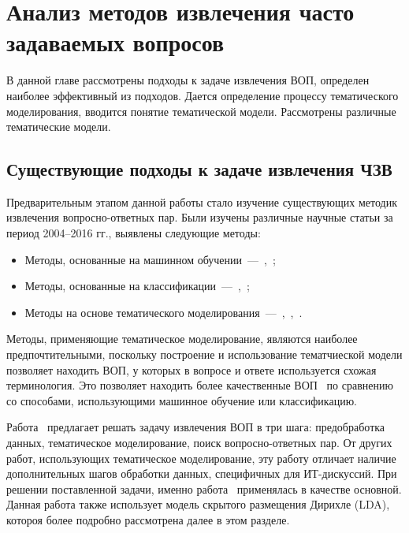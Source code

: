 \chapter{Анализ методов извлечения часто задаваемых вопросов}
\label{chap:overview}

В данной главе рассмотрены подходы к задаче извлечения ВОП, определен наиболее эффективный из подходов. Дается определение процессу тематического моделирования, вводится понятие тематической модели. Рассмотрены различные тематические модели.

\section{Существующие подходы к задаче извлечения ЧЗВ}
\label{sec:researches}

Предварительным этапом данной работы стало изучение существующих методик извлечения вопросно-ответных пар. Были изучены различные научные статьи за период 2004--2016 гг., выявлены следующие методы:

\begin{itemize}
\item Методы, основанные на машинном обучении~---~\cite{ML1},~\cite{ML2};
\item Методы, основанные на классификации~---~\cite{classif1},~\cite{engine};
\item Методы на основе тематического моделирования~---~\cite{LDA1},~\cite{LDA2},~\cite{original}.
\end{itemize}

Методы, применяющие тематическое моделирование, являются наиболее предпочтительными, поскольку построение и использование тематчиеской модели позволяет находить ВОП, у которых в вопросе и ответе используется схожая терминология. Это позволяет находить более качественные ВОП~\cite{LDA2} по сравнению со способами, использующими машинное обучение или классификацию.

Работа~\cite{original} предлагает решать задачу извлечения ВОП в три шага: предобработка данных, тематическое моделирование, поиск вопросно-ответных пар. От других работ, использующих тематическое моделирование, эту работу отличает наличие дополнительных шагов обработки данных, специфичных для ИТ-дискуссий. При решении поставленной задачи, именно работа~\cite{original} применялась в качестве основной. Данная работа также использует модель скрытого размещения Дирихле (LDA), котороя более подробно рассмотрена далее в этом разделе.

